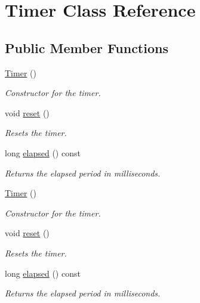 \hypertarget{classTimer}{}\section{Timer Class Reference}
\label{classTimer}
\subsection*{Public Member Functions}
\begin{DoxyCompactItemize}
\item 
\hyperlink{classTimer_a5f16e8da27d2a5a5242dead46de05d97}{Timer} ()
\begin{DoxyCompactList}\small\item\em Constructor for the timer. \end{DoxyCompactList}\item 
void \hyperlink{classTimer_a9020542d73357a4eef512eefaf57524b}{reset} ()
\begin{DoxyCompactList}\small\item\em Resets the timer. \end{DoxyCompactList}\item 
long \hyperlink{classTimer_aa6e8575043cd8cd45754786e2f714c9a}{elapsed} () const
\begin{DoxyCompactList}\small\item\em Returns the elapsed period in milliseconds. \end{DoxyCompactList}\item 
\hyperlink{classTimer_a5f16e8da27d2a5a5242dead46de05d97}{Timer} ()
\begin{DoxyCompactList}\small\item\em Constructor for the timer. \end{DoxyCompactList}\item 
void \hyperlink{classTimer_a9020542d73357a4eef512eefaf57524b}{reset} ()
\begin{DoxyCompactList}\small\item\em Resets the timer. \end{DoxyCompactList}\item 
long \hyperlink{classTimer_aa6e8575043cd8cd45754786e2f714c9a}{elapsed} () const
\begin{DoxyCompactList}\small\item\em Returns the elapsed period in milliseconds. \end{DoxyCompactList}\end{DoxyCompactItemize}


